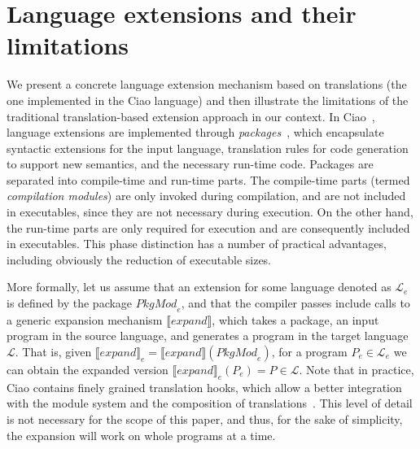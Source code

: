 \documentclass[preprint]{llncs}
\begin{document}
\newcommand\sfun[1]{\llbracket \textit{#1} \rrbracket}
\newcommand\sfunx[2]{\llbracket \textit{#1} \rrbracket #2}

\section{Language extensions and their limitations}
\label{sec:background}

We present a concrete language extension mechanism based on
translations (the one implemented in the Ciao language) and then
illustrate the limitations of the traditional translation-based
extension approach in our context.  In
Ciao~\cite{hermenegildo11:ciao-design-tplp}, language extensions are
implemented through \emph{packages}~\cite{ciao-modules-cl2000}, which
encapsulate syntactic extensions for the input language, translation
rules for code generation to support new semantics, and the necessary
run-time code.  Packages are separated into compile-time and run-time
parts. The compile-time parts (termed \emph{compilation modules}) are
only invoked during compilation, and are not included in executables,
since they are not necessary during execution.
On the other hand, the run-time parts are only required for execution
and are consequently included in executables.
This phase distinction has a number of practical advantages, including
obviously the reduction of executable sizes.

More formally, let us assume that an extension for some language denoted
as $\mathcal{L}_e$ is defined by the package $\textit{PkgMod}_e$, and that
the compiler passes include calls to a generic expansion mechanism
$\sfun{expand}$, which takes a package, an input program in the source
language, and generates a program in the target language
$\mathcal{L}$.
That is, given $\sfunx{expand}{_e} =
\sfunx{expand}{(\textit{PkgMod}_e)}$, for a program $P_e \in
\mathcal{L}_e$ we can obtain the expanded version
$\sfunx{expand}{_e(P_e)} = P \in \mathcal{L}$. Note that in practice,
Ciao contains finely grained translation hooks, which allow a better
integration with the module system and the composition of
translations~\cite{composing-extensions-lopstr-11}. This level of
detail is not necessary for the scope of this paper, and thus, for the
sake of simplicity, the expansion will work on whole programs at a
time.

\newcommand\kw[1]{~\mbox{\tt #1}~}
\newcommand\rr[2]{\mbox{\textsf{\textbf{#1}}}\llbracket~#2~\rrbracket}
\newcommand\rrl[2]{\mbox{\textsf{\textbf{#1}}}\llbracket#2\rrbracket}
\end{document}
